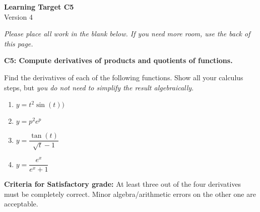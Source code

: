 \documentclass[10pt]{article}
\begin{document}
	\vspace*{0in}

		\begin{center}
			\textbf{Learning Target C5} \\
			{Version 4} \\
		\end{center}

\emph{Please place all work in the blank below. If you need more room, use the back of this page.}

\begin{framed}
	\textbf{C5: Compute derivatives of products and quotients of functions.}
\end{framed}

Find the derivatives of each of the following functions. Show all your calculus steps, but \emph{you do not need to simplify the result algebraically}. 

\begin{enumerate}
    \item $y = t^2\sin(t))$
    \item $y = p^2 e^p$
    \item $y = \dfrac{\tan(t)}{\sqrt{t}-1}$
    \item $y = \dfrac{e^x}{e^x + 1}$
\end{enumerate}

\vfill


\begin{small}
    \begin{framed}
        	\textbf{Criteria for Satisfactory grade:} At least three out of the four derivatives must be completely correct. Minor algebra/arithmetic errors on the other one are acceptable. 
    \end{framed}

\end{small}
\end{document}
